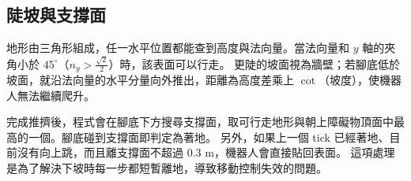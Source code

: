 \subsection{陡坡與支撐面}

地形由三角形組成，任一水平位置都能查到高度與法向量。當法向量和 $y$ 軸的夾角小於 $45^\circ$（$n_y>\frac{\sqrt{2}}{2}$）時，該表面可以行走。
更陡的坡面視為牆壁；若腳底低於坡面，就沿法向量的水平分量向外推出，距離為高度差乘上 $\cot$（坡度），使機器人無法繼續爬升。

完成推擠後，程式會在腳底下方搜尋支撐面，取可行走地形與朝上障礙物頂面中最高的一個。腳底碰到支撐面即判定為著地。
另外，如果上一個 tick 已經著地、目前沒有向上跳，而且離支撐面不超過 0.3 m，機器人會直接貼回表面。
這項處理是為了解決下坡時每一步都短暫離地，導致移動控制失效的問題。
